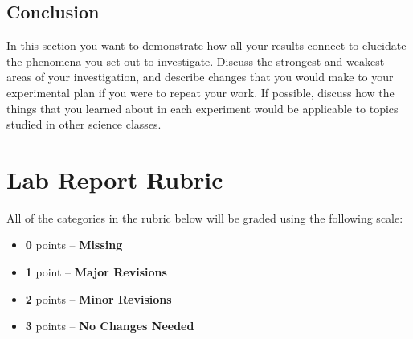 \subsection*{Conclusion}
In this section you want to demonstrate how all your results connect to elucidate the phenomena you set out to investigate.
Discuss the strongest and weakest areas of your investigation, and describe changes that you would make to your experimental plan if you were to repeat your work.
If possible, discuss how the things that you learned about in each experiment would be applicable to topics studied in other science classes.

\newpage

\section*{Lab Report Rubric}
All of the categories in the rubric below will be graded using the following scale:
\begin{itemize}
\itemsep-0.5em
\item \textbf{0} points – \textbf{Missing}
\item \textbf{1} point – \textbf{Major Revisions} 
\item \textbf{2} points – \textbf{Minor Revisions} 
\item \textbf{3} points – \textbf{No Changes Needed}
\end{itemize}

